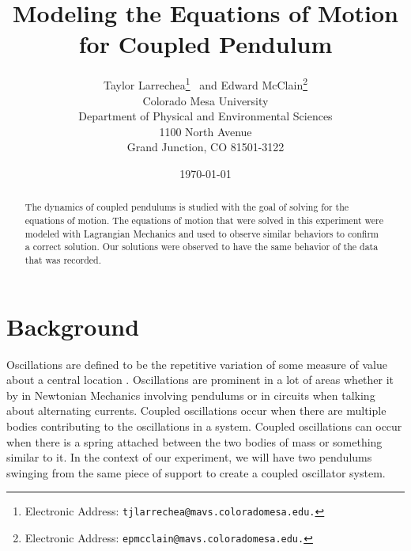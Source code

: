 \documentclass[twocolumn]{article}
\title{\textbf{Modeling the Equations of Motion for Coupled Pendulum}}
\author{Taylor Larrechea\footnote{Electronic Address: \texttt{tjlarrechea@mavs.coloradomesa.edu.}} \ and Edward McClain\footnote{Electronic Address: \texttt{epmcclain@mavs.coloradomesa.edu.}} \\
    Colorado Mesa University \\
    Department of Physical and Environmental Sciences \\
    1100 North Avenue \\
    Grand Junction, CO 81501-3122}
\date{\today}
\begin{document}
\maketitle
\begin{abstract}
The dynamics of coupled pendulums is studied with the goal of solving for the equations of motion. The equations of motion that were solved in this experiment were modeled with Lagrangian Mechanics and used to observe similar behaviors to confirm a correct solution. Our solutions were observed to have the same behavior of the data that was recorded.
\end{abstract}
\section*{Background}
Oscillations are defined to be the repetitive variation of some measure of value about a central location \cite{WikiOsc}. Oscillations are prominent in a lot of areas whether it by in Newtonian Mechanics involving pendulums or in circuits when talking about alternating currents. Coupled oscillations occur when there are multiple bodies contributing to the oscillations in a system. Coupled oscillations can occur when there is a spring attached between the two bodies of mass or something similar to it. In the context of our experiment, we will have two pendulums swinging from the same piece of support to create a coupled oscillator system.
\end{document}
